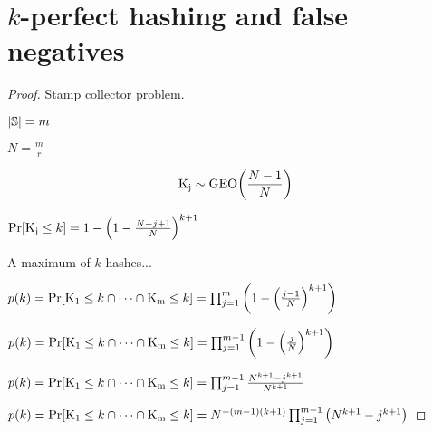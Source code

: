 \documentclass[ ../main.tex]{subfiles}
\begin{document}
\section{$k$-perfect hashing and false negatives}




\begin{proof}
Stamp collector problem.

$\left\vert{\mathbb{S}}\right\vert = m$

$N = \frac{m}{r}$

\begin{equation}
    \mathrm{K_j} \sim \operatorname{\rm{GEO}}\!\left(\frac{N-1}{N}\right)
\end{equation}


$\Pr[\mathrm{K_j} \leq k] = 1 - \left(1 - \frac{N-j+1}{N}\right)^{k+1}$

A maximum of $k$ hashes...

$p(k) = \Pr[\mathrm{K_1} \leq k \cap \cdots \cap \mathrm{K_m} \leq k] = \prod_{j=1}^{m}\left(1 - \left(\frac{j-1}{N}\right)^{k+1}\right)$

$p(k) = \Pr[\mathrm{K_1} \leq k \cap \cdots \cap \mathrm{K_m} \leq k] = \prod_{j=1}^{m-1}\left(1 - \left(\frac{j}{N}\right)^{k+1}\right)$


$p(k) = \Pr[\mathrm{K_1} \leq k \cap \cdots \cap \mathrm{K_m} \leq k] = \prod_{j=1}^{m-1}\frac{N^{k+1} - j^{k+1}}{N^{k+1}}$


$p(k) = \Pr[\mathrm{K_1} \leq k \cap \cdots \cap \mathrm{K_m} \leq k] = N^{-(m-1)(k+1)} \prod_{j=1}^{m-1}\left(N^{k+1} - j^{k+1}\right)$


\end{proof}
\end{document}
